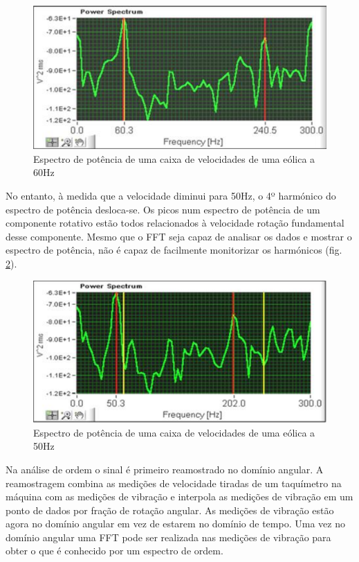 \begin{figure}[H]
\centering
\includegraphics[scale=0.3]{figs/power_spectrum1}
\caption{Espectro de potência de uma caixa de velocidades de uma eólica a 60Hz \cite{orderAnalysis2}}\label{power espectrum 1}
\end{figure}


No entanto, à medida que a velocidade diminui para 50Hz, o 4º harmónico do espectro de potência desloca-se. Os picos num espectro de potência de um componente rotativo estão todos relacionados à velocidade rotação  fundamental desse componente. Mesmo que o FFT seja capaz de analisar os dados e mostrar o espectro de potência, não é capaz de facilmente monitorizar os harmónicos (fig. \ref{power espectrum 2}).

\begin{figure}[H]
\centering
\includegraphics[scale=0.3]{figs/power_spectrum2}
\caption{Espectro de potência de uma caixa de velocidades de uma eólica a 50Hz \cite{orderAnalysis2}}\label{power espectrum 2}
\end{figure}

Na análise de ordem o sinal é primeiro reamostrado no domínio angular. A reamostragem combina as medições de velocidade tiradas de um taquímetro na máquina com as medições de vibração e interpola as medições de vibração em um ponto de dados por fração de rotação angular. As medições de vibração estão agora no domínio angular em vez de estarem no domínio de tempo. Uma vez no domínio angular uma FFT pode ser realizada nas medições de vibração para obter o que é conhecido por um espectro de ordem.


